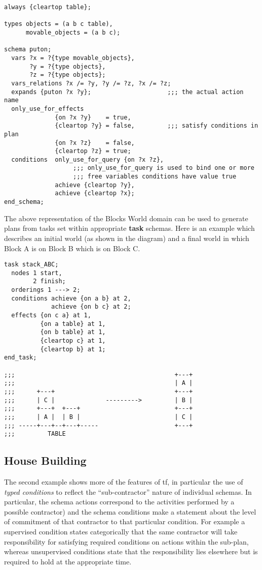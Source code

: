 \begin{verbatim}
always {cleartop table};

types objects = (a b c table),
      movable_objects = (a b c);

schema puton;
  vars ?x = ?{type movable_objects},
       ?y = ?{type objects},
       ?z = ?{type objects};
  vars_relations ?x /= ?y, ?y /= ?z, ?x /= ?z;
  expands {puton ?x ?y};                     ;;; the actual action name
  only_use_for_effects
              {on ?x ?y}    = true,
              {cleartop ?y} = false,         ;;; satisfy conditions in plan
              {on ?x ?z}    = false,
              {cleartop ?z} = true;
  conditions  only_use_for_query {on ?x ?z}, 
                   ;;; only_use_for_query is used to bind one or more
                   ;;; free variables conditions have value true
              achieve {cleartop ?y},         
              achieve {cleartop ?x};
end_schema;
\end{verbatim}

The above representation of the Blocks World domain can be used to generate
plans from tasks set within appropriate {\bf task} schemas.  Here is an
example which describes an initial world (as shown in the diagram) and a
final world in which Block A is on Block B which is on Block C.

\begin{verbatim}
task stack_ABC;
  nodes 1 start,
        2 finish;
  orderings 1 ---> 2;
  conditions achieve {on a b} at 2,
             achieve {on b c} at 2;
  effects {on c a} at 1,
          {on a table} at 1,
          {on b table} at 1,
          {cleartop c} at 1,
          {cleartop b} at 1;
end_task;

;;;                                            +---+
;;;                                            | A |
;;;      +---+                                 +---+
;;;      | C |              --------->         | B |     
;;;      +---+  +---+                          +---+
;;;      | A |  | B |                          | C |
;;; -----+---+--+---+-----                     +---+
;;;         TABLE
\end{verbatim}

\subsection{House Building}

The second example shows more of the features of {\sc tf}, in particular the
use of {\em typed conditions} to reflect the ``sub-contractor'' nature of
individual schemas.  In particular, the schema actions correspond to the
activities performed by a possible contractor) and the schema conditions make
a statement about the level of commitment of that contractor to that
particular condition.  For example a supervised condition states categorically
that the same contractor will take responsibility for satisfying required
conditions on actions within the sub-plan, whereas unsupervised conditions
state that the responsibility lies elsewhere but is required to hold at the
appropriate time.

